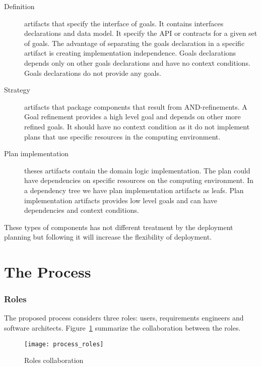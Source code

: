 \begin{description}
  \item[Definition] artifacts that specify the interface of goals. It contains interfaces declarations and data model. It specify the API or contracts for a given set of goals.
  The advantage of separating the goals declaration in a specific artifact is creating implementation independence.
  Goals declarations depends only on other goals declarations and have no context conditions. Goals declarations do not provide any goals.

  \item[Strategy] artifacts that package components that result from AND-refinements. A Goal refinement provides a high level goal and depends on other more refined goals. It should have no context condition as it do not implement plans that use specific resources in the computing environment.

  \item[Plan implementation] theses artifacts contain the domain logic implementation. The plan could have dependencies on specific resources on the computing environment. In a dependency tree we have plan implementation artifacts as leafs.
  Plan implementation artifacts provides low level goals and can have dependencies and context conditions.

\end{description}

These types of components has not different treatment by the deployment planning but following it will increase the flexibility of deployment.


\section{The Process}

\subsubsection{Roles}
The proposed process considers three roles: users, requirements engineers and software architects.
Figure~\ref{fig:process_roles} summarize the collaboration between the roles.

 \begin{figure}[!htb]
   \centering
   \texttt{[image: process\_roles]}
   \caption{Roles collaboration}
 \label{fig:process_roles}
 \end{figure}

